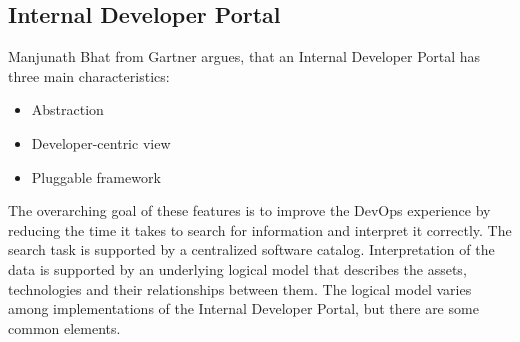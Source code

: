 \documentclass[a4paper,12pt]{article}
\begin{document}
    \subsection{Internal Developer Portal}
    \label{subsec:vpportal}
    Manjunath Bhat from Gartner argues, that an Internal Developer Portal has three main characteristics\parencite{gartner}:
    \begin{itemize}
        \item Abstraction
        \item Developer-centric view
        \item Pluggable framework
    \end{itemize}
    The overarching goal of these features is to improve the DevOps experience by reducing the time it takes to search
    for information and interpret it correctly.
    The search task is supported by a centralized software catalog.
    Interpretation of the data is supported by an underlying logical model that describes the assets, technologies
    and their relationships between them.
    The logical model varies among implementations of the Internal Developer Portal, but there are some common elements.
\end{document}

